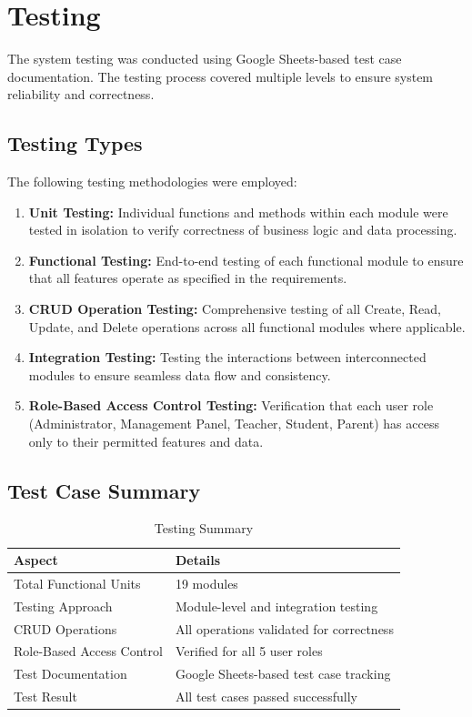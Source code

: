 \documentclass[12pt, a4paper]{report}
\begin{document}
\chapter{Testing}

The system testing was conducted using Google Sheets-based test case documentation. The testing process covered multiple levels to ensure system reliability and correctness.

\section{Testing Types}

The following testing methodologies were employed:

\begin{enumerate}
    \item \textbf{Unit Testing:} Individual functions and methods within each module were tested in isolation to verify correctness of business logic and data processing.
    \item \textbf{Functional Testing:} End-to-end testing of each functional module to ensure that all features operate as specified in the requirements.
    \item \textbf{CRUD Operation Testing:} Comprehensive testing of all Create, Read, Update, and Delete operations across all functional modules where applicable.
    \item \textbf{Integration Testing:} Testing the interactions between interconnected modules to ensure seamless data flow and consistency.
    \item \textbf{Role-Based Access Control Testing:} Verification that each user role (Administrator, Management Panel, Teacher, Student, Parent) has access only to their permitted features and data.
\end{enumerate}

\section{Test Case Summary}

\begin{table}[H]
\centering
\caption{Testing Summary}
\label{tab:testing-summary}
\begin{tabular}{l l}
\toprule
\textbf{Aspect} & \textbf{Details} \\
\midrule
Total Functional Units        & 19 modules \\
Testing Approach              & Module-level and integration testing \\
CRUD Operations               & All operations validated for correctness \\
Role-Based Access Control     & Verified for all 5 user roles \\
Test Documentation            & Google Sheets-based test case tracking \\
Test Result                   & All test cases passed successfully \\
\bottomrule
\end{tabular}
\end{table}
\end{document}
